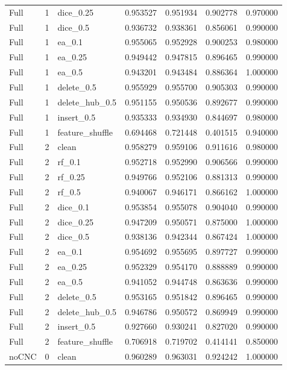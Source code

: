 \documentclass[UTF8,a4paper,11pt,fontset=fandol]{ctexart}
\begin{document}
{\begin{longtable}{lrlrrrr}
Full & 1 & dice\_0.25 & 0.953527 & 0.951934 & 0.902778 & 0.970000 \\
Full & 1 & dice\_0.5 & 0.936732 & 0.938361 & 0.856061 & 0.990000 \\
Full & 1 & ea\_0.1 & 0.955065 & 0.952928 & 0.900253 & 0.980000 \\
Full & 1 & ea\_0.25 & 0.949442 & 0.947815 & 0.896465 & 0.990000 \\
Full & 1 & ea\_0.5 & 0.943201 & 0.943484 & 0.886364 & 1.000000 \\
Full & 1 & delete\_0.5 & 0.955929 & 0.955700 & 0.905303 & 0.990000 \\
Full & 1 & delete\_hub\_0.5 & 0.951155 & 0.950536 & 0.892677 & 0.990000 \\
Full & 1 & insert\_0.5 & 0.935333 & 0.934930 & 0.844697 & 0.980000 \\
Full & 1 & feature\_shuffle & 0.694468 & 0.721448 & 0.401515 & 0.940000 \\
Full & 2 & clean & 0.958279 & 0.959106 & 0.911616 & 0.980000 \\
Full & 2 & rf\_0.1 & 0.952718 & 0.952990 & 0.906566 & 0.990000 \\
Full & 2 & rf\_0.25 & 0.949766 & 0.952106 & 0.881313 & 0.990000 \\
Full & 2 & rf\_0.5 & 0.940067 & 0.946171 & 0.866162 & 1.000000 \\
Full & 2 & dice\_0.1 & 0.953854 & 0.955078 & 0.904040 & 0.990000 \\
Full & 2 & dice\_0.25 & 0.947209 & 0.950571 & 0.875000 & 1.000000 \\
Full & 2 & dice\_0.5 & 0.938136 & 0.942344 & 0.867424 & 1.000000 \\
Full & 2 & ea\_0.1 & 0.954692 & 0.955695 & 0.897727 & 0.990000 \\
Full & 2 & ea\_0.25 & 0.952329 & 0.954170 & 0.888889 & 0.990000 \\
Full & 2 & ea\_0.5 & 0.941052 & 0.944748 & 0.863636 & 0.990000 \\
Full & 2 & delete\_0.5 & 0.953165 & 0.951842 & 0.896465 & 0.990000 \\
Full & 2 & delete\_hub\_0.5 & 0.946786 & 0.950572 & 0.869949 & 0.990000 \\
Full & 2 & insert\_0.5 & 0.927660 & 0.930241 & 0.827020 & 0.990000 \\
Full & 2 & feature\_shuffle & 0.706918 & 0.719702 & 0.414141 & 0.850000 \\
noCNC & 0 & clean & 0.960289 & 0.963031 & 0.924242 & 1.000000 \\

\end{longtable}}
\end{document}
